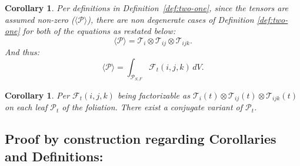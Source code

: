 \documentclass[10pt]{article}
\theoremstyle{plain}
\newtheorem{corollary}[theorem]{Corollary}
\theoremstyle{definition}
\theoremstyle{remark}
\begin{document}
\begin{corollary}
\label{cor:tensor-nz}
  Per definitions in Definition~\ref{def:two-one}, since the tensors are assumed non-zero ($\langle \mathcal{P} \rangle$), there are non degenerate cases of Definition \ref{def:two-one} for both of the equations as restated below:
  \begin{equation}
    \langle \mathcal{P} \rangle = \mathcal{T}_i \otimes \mathcal{T}_{ij} \otimes \mathcal{T}_{ijk}.
  \end{equation}
  And thus:
  \begin{equation}
    \langle \mathcal{P} \rangle = \int_{\mathcal{P}_{S,F}} \mathcal{F}_{t}(i, j, k) \, dV.
  \end{equation}
\end{corollary}

\begin{corollary}
\label{cor:three}
  Per $\mathcal{F}_t(i, j, k)$ being factorizable as $\mathcal{T}_i(t) \otimes \mathcal{T}_{ij}(t) \otimes \mathcal{T}_{ijk}(t)$ on each leaf $\mathcal{P}_t$ of the foliation. There exist a conjugate variant of $\mathcal{P}_t$.
\end{corollary}

\subsection{Proof by construction regarding Corollaries and Definitions:}
\end{document}
